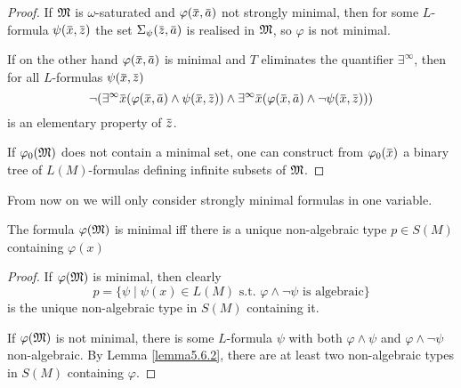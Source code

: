 \documentclass[11pt]{article}
\begin{document}
\begin{proof}
If \(\mathfrak{M}\) is \(\omega\)-saturated and \(\varphi(\barx,\bara)\) not strongly minimal, then for
some \(L\)-formula \(\psi(\barx,\barz)\) the set \(\Sigma_\psi(\barz,\bara)\) is realised in \(\mathfrak{M}\), so \(\varphi\) is not minimal.

If on the other hand \(\varphi(\barx,\bara)\) is minimal and \(T\) eliminates the quantifier \(\exists^\infty\),
then for all \(L\)-formulas \(\psi(\barx,\barz)\)
\begin{equation*}
\neg(\exists^\infty\barx(\varphi(\barx,\bara)\wedge\psi(\barx,\barz))\wedge\exists^\infty\barx(\varphi(\barx,\bara)\wedge\neg\psi(\barx,\barz)))
\end{equation*}
is an elementary property of \(\barz\).

If \(\varphi_0(\mathfrak{M})\) does not contain a minimal set, one can construct from \(\varphi_0(\barx)\) a binary
tree of \(L(M)\)-formulas defining infinite subsets of \(\mathfrak{M}\).
\end{proof}

From now on we will only consider strongly minimal formulas in one variable.

\begin{lemma}[]
\label{lemma5.7.3}
The formula \(\varphi(\mathfrak{M})\) is minimal iff there is a unique non-algebraic type \(p\in S(M)\) containing \(\varphi(x)\)
\end{lemma}

\begin{proof}
If \(\varphi(\mathfrak{M})\) is minimal, then clearly
\begin{equation*}
p=\{\psi\mid\psi(x)\in L(M)\text{ s.t. }\varphi\wedge\neg\psi\text{ is algebraic}\}
\end{equation*}
is the unique non-algebraic type in \(S(M)\) containing it.

If \(\varphi(\mathfrak{M})\) is not minimal, there is some \(L\)-formula \(\psi\) with both \(\varphi\wedge\psi\) and \(\varphi\wedge\neg\psi\)
non-algebraic. By Lemma \ref{lemma5.6.2}, there are at least two non-algebraic types in \(S(M)\)
containing \(\varphi\).
\end{proof}
\end{document}
